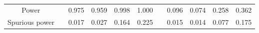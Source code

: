 % 
\begin{tabular}{ccccccccccc}
  \hline
  \hline
Power &  & 0.975 & 0.959 & 0.998 & 1.000 &  & 0.096 & 0.074 & 0.258 & 0.362 \\ 
  Spurious power &  & 0.017 & 0.027 & 0.164 & 0.225 &  & 0.015 & 0.014 & 0.077 & 0.175 \\ 
   \hline
\end{tabular}
